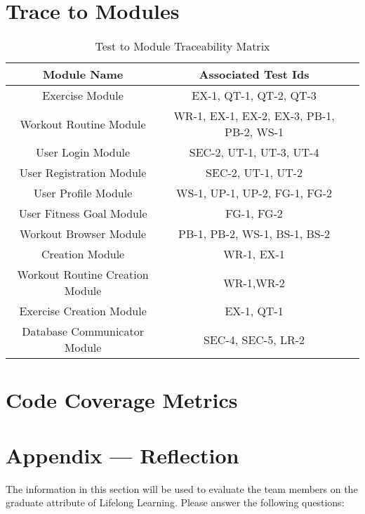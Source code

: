 \documentclass[12pt, titlepage]{article}
\begin{document}
\section{Trace to Modules}		
\begin{table}[H]
	\begin{tabular}{|c|c|c|}
		\hline
		\textbf{Module Name} & \textbf{Associated Test Ids}\\ \hline
		Exercise Module & EX-1, QT-1, QT-2, QT-3  \\\hline
		Workout Routine Module & WR-1, EX-1, EX-2, EX-3, PB-1, PB-2, WS-1\\\hline
		User Login Module & SEC-2, UT-1, UT-3, UT-4 \\\hline
		User Registration Module & SEC-2, UT-1, UT-2\\\hline
		User Profile Module & WS-1, UP-1, UP-2, FG-1, FG-2\\\hline
		User Fitness Goal Module & FG-1, FG-2\\\hline
		Workout Browser Module & PB-1, PB-2, WS-1, BS-1, BS-2\\\hline
		Creation Module & WR-1, EX-1 \\\hline
		Workout Routine Creation Module & WR-1,WR-2\\\hline
		Exercise Creation Module & EX-1, QT-1\\\hline
		Database Communicator Module & SEC-4, SEC-5, LR-2\\\hline
		
	\end{tabular}
	\caption{Test to Module Traceability Matrix}
	\label{Table:R_trace}
\end{table}
\section{Code Coverage Metrics}



\newpage{}
\section*{Appendix --- Reflection}

The information in this section will be used to evaluate the team members on the
graduate attribute of Lifelong Learning.  Please answer the following questions:
\end{document}
